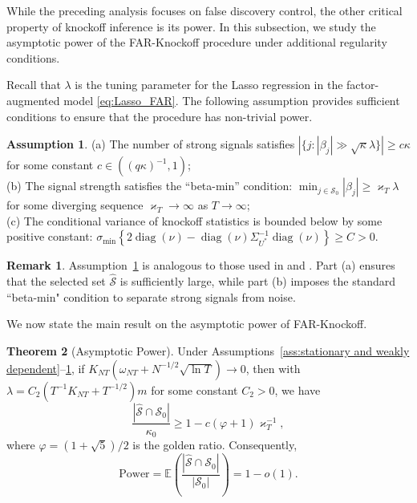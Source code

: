 ﻿\documentclass[12pt]{article}
\newcommand{\0}{\mbox{\bf 0}}
\theoremstyle{plain}%
\newtheorem{remark}{Remark}
\newtheorem{theorem}{Theorem}[section]
\theoremstyle{definition}
\newtheorem{theorem}{Theorem}[section]
\newtheorem{assumption}{Assumption}
\newtheorem{remark}[theorem]{Remark}
\DeclareMathOperator{\diag}{diag}
\begin{document}
{While the preceding analysis focuses on false discovery control, the other critical property of knockoff inference is its power. In this subsection, we study the asymptotic power of the FAR-Knockoff procedure under additional regularity conditions.

Recall that $\lambda$ is the tuning parameter for the Lasso regression in the factor-augmented model \eqref{eq:Lasso_FAR}. The following assumption provides sufficient conditions to ensure that the procedure has non-trivial power.

\begin{assumption}
\label{ass:power_condition}
(a) The number of strong signals satisfies 
$\left| \{ j : |\beta_j| \gg \sqrt{\kappa} \lambda \} \right| \geq c \kappa$ 
for some constant $c \in ((q\kappa)^{-1}, 1)$; \\
(b) The signal strength satisfies the ``beta-min'' condition:
$\min_{j \in \mathcal{S}_0} |\beta_j| \geq \varkappa_T \lambda$ 
for some diverging sequence $\varkappa_T \to \infty$ as $T \to \infty$; \\
(c) The conditional variance of knockoff statistics is bounded below by some positive constant: 
$
\sigma_{\min} \left\{ 2 \diag(\nu) - \diag(\nu) \Sigma_{U^{\ast}}^{-1} \diag(\nu) \right\} \geq C >0.
$
\end{assumption}

\begin{remark}
Assumption~\ref{ass:power_condition} is analogous to those used in \citet*{FanDemirkayaLiLv2020} and \citet{LiuSunKe2024}. Part (a) ensures that the selected set $\widehat{\mathcal{S}}$ is sufficiently large, while part (b) imposes the standard ``beta-min" condition to separate strong signals from noise. %
\end{remark}

We now state the main result on the asymptotic power of FAR-Knockoff.

\begin{theorem}[Asymptotic Power]
\label{thm:Power}
Under Assumptions~\ref{ass:stationary and weakly dependent}--\ref{ass:power_condition}, if $K_{NT}(\omega_{NT} + N^{-1/2}\sqrt{\ln T}) \to 0$, then with $\lambda = C_2(T^{-1} K_{NT} + T^{-1/2})m$ for some constant $C_2 > 0$, we have
\begin{equation*}
\frac{|\widehat{\mathcal{S}} \cap \mathcal{S}_0|}{\kappa_0} \geq 1 - c(\varphi + 1) \varkappa_T^{-1},
\end{equation*}
where $\varphi = (1 + \sqrt{5}) / 2$ is the golden ratio. Consequently,
\begin{equation*}
\mathrm{Power} = \mathbb{E} \left( \frac{|\widehat{\mathcal{S}} \cap \mathcal{S}_0|}{|\mathcal{S}_0|} \right) = 1 - o(1).
\end{equation*}
\end{theorem}

}
\end{document}
